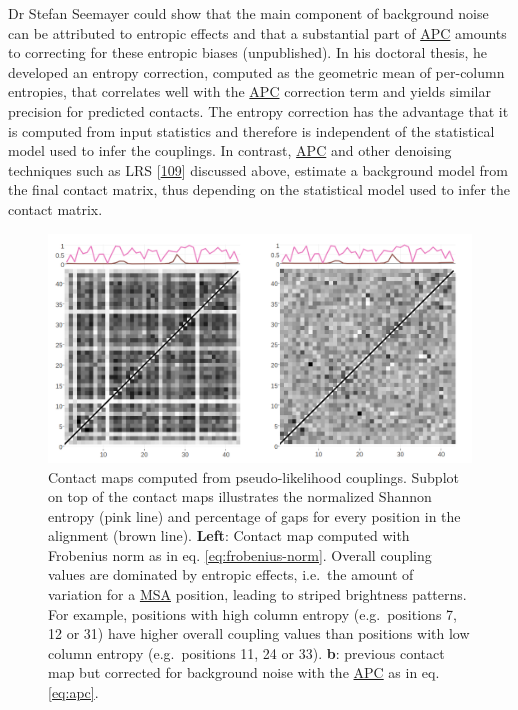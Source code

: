 \documentclass[11pt,a4paper,twoside]{book}
\theoremstyle{definition}
\theoremstyle{definition}
\theoremstyle{remark}
\begin{document}
Dr Stefan Seemayer could show that the main component of background
noise can be attributed to entropic effects and that a substantial part
of \protect\hyperlink{abbrev}{APC} amounts to correcting for these
entropic biases (unpublished). In his doctoral thesis, he developed an
entropy correction, computed as the geometric mean of per-column
entropies, that correlates well with the \protect\hyperlink{abbrev}{APC}
correction term and yields similar precision for predicted contacts. The
entropy correction has the advantage that it is computed from input
statistics and therefore is independent of the statistical model used to
infer the couplings. In contrast, \protect\hyperlink{abbrev}{APC} and
other denoising techniques such as LRS
{[}\protect\hyperlink{ref-Zhang2016}{109}{]} discussed above, estimate a
background model from the final contact matrix, thus depending on the
statistical model used to infer the contact matrix.















\begin{figure}

{\centering \includegraphics[width=0.9\linewidth]{img/intro/apc_correction_with_entropy} 

}

\caption{Contact maps computed from
pseudo-likelihood couplings. Subplot on top of the contact maps
illustrates the normalized Shannon entropy ({pink } line) and percentage
of gaps for every position in the alignment ({brown } line).
\textbf{Left}: Contact map computed with Frobenius norm as in eq.
\eqref{eq:frobenius-norm}. Overall coupling values are dominated by
entropic effects, i.e.~the amount of variation for a
\protect\hyperlink{abbrev}{MSA} position, leading to striped brightness
patterns. For example, positions with high column entropy
(e.g.~positions 7, 12 or 31) have higher overall coupling values than
positions with low column entropy (e.g.~positions 11, 24 or 33).
\textbf{b}: previous contact map but corrected for background noise with
the \protect\hyperlink{abbrev}{APC} as in eq. \eqref{eq:apc}.}\label{fig:apc-correction}
\end{figure}
\end{document}
